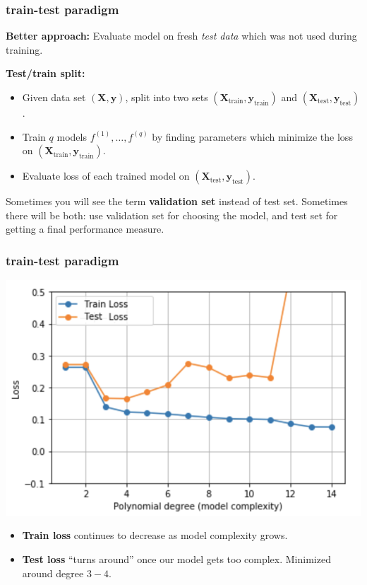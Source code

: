 \documentclass[handout,compress]{beamer}
\newcommand{\bv}[1]{\mathbf{#1}}
\begin{document}
\begin{frame}
	\frametitle{train-test paradigm}
	\textbf{Better approach:} Evaluate model on fresh \emph{test data} which was not used during training.
	
	\textbf{Test/train split:}
	\begin{itemize}
		\item Given data set $(\bv{X}, \bv{y})$, split into two sets $(\bv{X}_{\text{train}}, \bv{y}_{\text{train}})$ and $(\bv{X}_{\text{test}}, \bv{y}_{\text{test}})$.
		\item Train $q$ models $f^{(1)}, \ldots, f^{(q)}$ by finding parameters which minimize the loss on $(\bv{X}_{\text{train}}, \bv{y}_{\text{train}})$.
		\item Evaluate loss of each trained model on $(\bv{X}_{\text{test}}, \bv{y}_{\text{test}})$.
	\end{itemize}
\begin{center}
	\small
	Sometimes you will see the term \textbf{\alert{validation set}} instead of test set. Sometimes there will be both: use validation set for choosing the model, and test set for getting a final performance measure. 
\end{center}
\end{frame}

\begin{frame}
	\frametitle{train-test paradigm}

	\begin{center}
		\includegraphics[width=.6\textwidth]{generalization.png}
	\end{center}
	\begin{itemize}
		\item \textbf{Train loss} continues to decrease as model complexity grows.
		\item \textbf{Test loss} ``turns around'' once our model gets too complex. Minimized around degree $3-4$.
	\end{itemize}
\end{frame}
\end{document}
